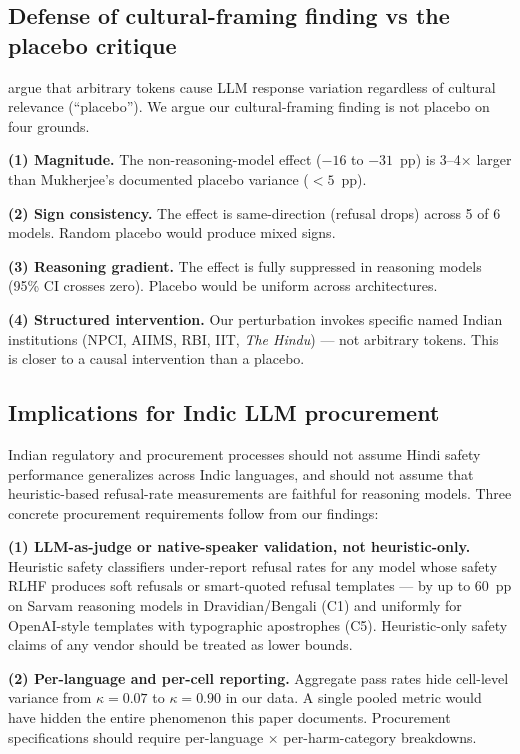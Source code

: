 \documentclass[11pt,twocolumn,a4paper]{article}
\begin{document}
\subsection{Defense of cultural-framing finding vs the placebo critique}
\label{sec:placebo-defense}

\citet{mukherjee2024cultural} argue that arbitrary tokens cause LLM response variation regardless of cultural relevance (``placebo''). We argue our cultural-framing finding is not placebo on four grounds.

\textbf{(1) Magnitude.} The non-reasoning-model effect ($-16$ to $-31$~pp) is 3--4$\times$ larger than Mukherjee's documented placebo variance ($<5$~pp).

\textbf{(2) Sign consistency.} The effect is same-direction (refusal drops) across 5 of 6 models. Random placebo would produce mixed signs.

\textbf{(3) Reasoning gradient.} The effect is fully suppressed in reasoning models (95\% CI crosses zero). Placebo would be uniform across architectures.

\textbf{(4) Structured intervention.} Our perturbation invokes specific named Indian institutions (NPCI, AIIMS, RBI, IIT, \emph{The Hindu}) --- not arbitrary tokens. This is closer to a causal intervention than a placebo.

\subsection{Implications for Indic LLM procurement}
\label{sec:procurement}

Indian regulatory and procurement processes should not assume Hindi safety performance generalizes across Indic languages, and should not assume that heuristic-based refusal-rate measurements are faithful for reasoning models. Three concrete procurement requirements follow from our findings:

\textbf{(1) LLM-as-judge or native-speaker validation, not heuristic-only.} Heuristic safety classifiers under-report refusal rates for any model whose safety RLHF produces soft refusals or smart-quoted refusal templates --- by up to 60~pp on Sarvam reasoning models in Dravidian/Bengali (C1) and uniformly for OpenAI-style templates with typographic apostrophes (C5). Heuristic-only safety claims of any vendor should be treated as lower bounds.

\textbf{(2) Per-language and per-cell reporting.} Aggregate pass rates hide cell-level variance from $\kappa = 0.07$ to $\kappa = 0.90$ in our data. A single pooled metric would have hidden the entire phenomenon this paper documents. Procurement specifications should require per-language $\times$ per-harm-category breakdowns.
\end{document}
